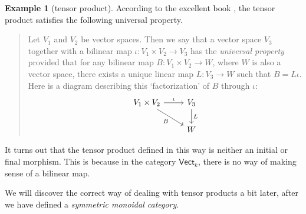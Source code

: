 \documentclass[a4paper]{report}
\theoremstyle{definition}
\newtheorem{example}{Example}[section]
\theoremstyle{plain}
\theoremstyle{remark}
\begin{document}
\begin{example}[tensor product]
  \label{eg:universalpropertyoftensorproduct}
  According to the excellent book \cite{sontz-principal-bundles-classical}, the tensor product satisfies the following universal property.
  \begin{quote}
    Let $V_{1}$ and $V_{2}$ be vector spaces. Then we say that a vector space $V_{3}$ together with a bilinear map $\iota\colon V_{1} \times V_{2} \to V_{3}$ has the \emph{universal property} provided that for any bilinear map $B\colon V_{1} \times V_{2} \to W$, where $W$ is also a vector space, there exists a unique linear map $L\colon V_{3} \to W$ such that $B = L\iota$. Here is a diagram describing this `factorization' of $B$ through $\iota$:
    \begin{equation*}
      \begin{tikzcd}
        V_{1} \times V_{2} \arrow[r, "\iota"] \arrow[rd, swap, "B"] & V_{3} \arrow[d, "L"] \\
        & W
      \end{tikzcd}
    \end{equation*}
  \end{quote}

  It turns out that the tensor product defined in this way is neither an initial or final morphism. This is because in the category $\mathsf{Vect}_{k}$, there is no way of making sense of a bilinear map. 

  We will discover the correct way of dealing with tensor products a bit later, after we have defined a \emph{symmetric monoidal category}.
\end{example}
\end{document}

